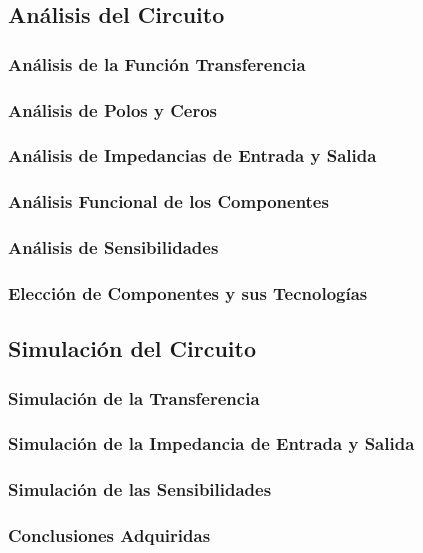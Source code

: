 \documentclass[a4paper]{article}
\begin{document}
\subsection{Análisis del Circuito}
\subsubsection{Análisis de la Función Transferencia}

\subsubsection{Análisis de Polos y Ceros}
\subsubsection{Análisis de Impedancias de Entrada y Salida}
\subsubsection{Análisis Funcional de los Componentes}
\subsubsection{Análisis de Sensibilidades}
\subsubsection{Elección de Componentes y sus Tecnologías}

\subsection{Simulación del Circuito}
\subsubsection{Simulación de la Transferencia}
\subsubsection{Simulación de la Impedancia de Entrada y Salida}
\subsubsection{Simulación de las Sensibilidades}
\subsubsection{Conclusiones Adquiridas}
\end{document}
